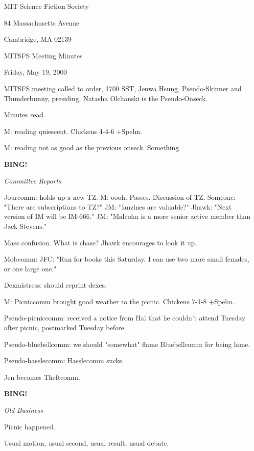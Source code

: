 \documentclass[12pt]{article}
\newcommand{\bing}{{\bf BING!} }
\newcommand{\goto}[1]{\bing \vskip 12pt \centerline{{\em{#1}}}}
\begin{document}
\begin{center}

MIT Science Fiction Society 

84 Massachusetts Avenue

Cambridge, MA 02139

\vspace{12pt}

MITSFS Meeting Minutes 

Friday, May 19, 2000

\end{center}
 
\vspace{18pt}

\setlength{\parskip}{6pt}

\noindent
MITSFS meeting called to order, 1700 SST, Jenwa Hsung, Pseudo-Skinner and Thunderbunny, presiding.  Natasha Olchanski is the Pseudo-Onseck.

Minutes read.

M: reading quiescent. Chickens 4-4-6 +Spehn.

M: reading not as good as the previous onseck. Something.

\goto{Committee Reports}

Jourcomm: holds up a new TZ. M: oooh. Passes. Discussion of TZ. Someone: "There are subscriptions to TZ?" JM: "fanzines are valuable?" Jhawk: "Next version of IM will be IM-666." JM: "Malcolm is a more senior active member than Jack Stevens."

Mass confusion. What is chase? Jhawk encourages to look it up.

Mobcomm: JFC: "Run for books this Saturday. I can use two more small females, or one large one."

Dexmistress: should reprint dexes.

M: Picniccomm brought good weather to the picnic. Chickens 7-1-8 +Spehn.

Pseudo-picniccomm: received a notice from Hal that he couldn't attend Tuesday after picnic, postmarked Tuesday before.

Pseudo-bluebellcomm: we should "somewhat" flame Bluebellcomm for being lame.

Pseudo-hasslecomm: Hasslecomm sucks.

Jen becomes Theftcomm.

\goto{Old Business}

Picnic happened.

Usual motion, usual second, usual result, usual debate.
\end{document}
